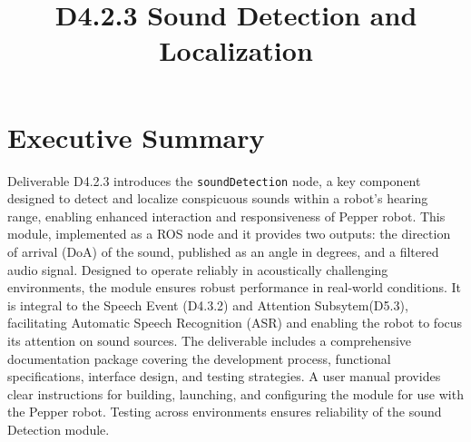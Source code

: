 \documentclass{CSSRforAfrica}
\begin{document}




\title{D4.2.3 Sound Detection and Localization}    

\partner{}                                      




\maketitle
 

\section*{Executive Summary}
\label{executive_summary}
Deliverable D4.2.3 introduces the \texttt{soundDetection} node, a key component designed to detect and localize conspicuous sounds within a robot's hearing range, enabling enhanced interaction and responsiveness of Pepper robot. This module, implemented as a ROS node and it provides two outputs: the direction of arrival (DoA) of the sound, published as an angle in degrees, and a filtered audio signal. Designed to operate reliably in acoustically challenging environments, the module ensures robust performance in real-world conditions. It is integral to the Speech Event (D4.3.2) and Attention Subsytem(D5.3), facilitating Automatic Speech Recognition (ASR) and enabling the robot to focus its attention on sound sources. The deliverable includes a comprehensive documentation package covering the development process, functional specifications, interface design, and testing strategies. A user manual provides clear instructions for building, launching, and configuring the module for use with the Pepper robot. Testing across environments ensures reliability of the sound Detection module.
\newpage
 
\pagebreak
\tableofcontents
\newpage
\end{document}
